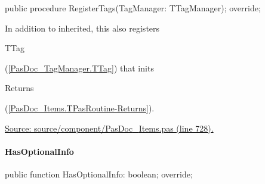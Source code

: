 \documentclass{report}
\newif\ifpdf
\begin{document}
\label{PasDoc_Items.TPasRoutine-RegisterTags}
\begin{list}{}{
\setlength{\itemindent}{0cm}
\setlength{\listparindent}{0cm}
\setlength{\leftmargin}{\evensidemargin}
\addtolength{\leftmargin}{\tmplength}
\settowidth{\labelsep}{X}
\addtolength{\leftmargin}{\labelsep}
\setlength{\labelwidth}{\tmplength}
}
\item[\textbf{Declaration}\hfill]
\ifpdf
\begin{flushleft}
\fi
\begin{ttfamily}
public procedure RegisterTags(TagManager: TTagManager); override;\end{ttfamily}

\ifpdf
\end{flushleft}
\fi

\par
\item[\textbf{Description}]
In addition to inherited, this also registers \begin{ttfamily}TTag\end{ttfamily}(\ref{PasDoc_TagManager.TTag}) that inits \begin{ttfamily}Returns\end{ttfamily}(\ref{PasDoc_Items.TPasRoutine-Returns}).\par
\href{https://github.com/pasdoc/pasdoc/blob/master/source/component/PasDoc_Items.pas#L728}{Source: source/component/PasDoc{\_}Items.pas (line 728).}

\end{list}
\paragraph*{HasOptionalInfo}\hspace*{\fill}

\label{PasDoc_Items.TPasRoutine-HasOptionalInfo}
\begin{list}{}{
\setlength{\itemindent}{0cm}
\setlength{\listparindent}{0cm}
\setlength{\leftmargin}{\evensidemargin}
\addtolength{\leftmargin}{\tmplength}
\settowidth{\labelsep}{X}
\addtolength{\leftmargin}{\labelsep}
\setlength{\labelwidth}{\tmplength}
}
\item[\textbf{Declaration}\hfill]
\ifpdf
\begin{flushleft}
\fi
\begin{ttfamily}
public function HasOptionalInfo: boolean; override;\end{ttfamily}

\ifpdf
\end{flushleft}
\fi

\end{list}
\end{document}
